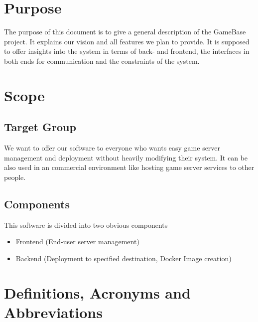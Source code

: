 \documentclass[a4paper,12pt,chapterprefix=false,bibliography=totoc,listof=totoc,]{scrreprt}
\begin{document}
\section{Purpose}
The purpose of this document is to give a general description of the GameBase project. It explains our vision and all features we plan to provide. It is supposed to offer insights into the system in terms of back- and frontend, the interfaces in both ends for communication and the constraints of the system.

\section{Scope}
\subsection*{Target Group}
We want to offer our software to everyone who wants easy game server management and deployment without heavily modifying their system. It can be also used in an commercial environment like hosting game server services to other people.

\subsection*{Components}
This software is divided into two obvious components
\begin{itemize}
	\item Frontend (End-user server management)
	\item Backend (Deployment to specified destination, Docker Image creation)
\end{itemize}

\section{Definitions, Acronyms and Abbreviations}
\printabbreviations[title={}]
\end{document}
